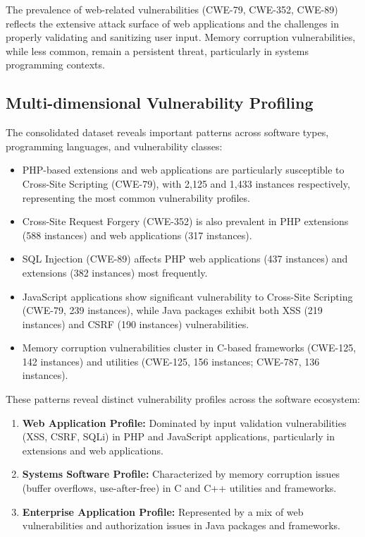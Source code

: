 The prevalence of web-related vulnerabilities (CWE-79, CWE-352, CWE-89) reflects the extensive attack surface of web applications and the challenges in properly validating and sanitizing user input. Memory corruption vulnerabilities, while less common, remain a persistent threat, particularly in systems programming contexts.

\subsection{Multi-dimensional Vulnerability Profiling}

The consolidated dataset reveals important patterns across software types, programming languages, and vulnerability classes:

\begin{itemize}
    \item PHP-based extensions and web applications are particularly susceptible to Cross-Site Scripting (CWE-79), with 2,125 and 1,433 instances respectively, representing the most common vulnerability profiles.
    \item Cross-Site Request Forgery (CWE-352) is also prevalent in PHP extensions (588 instances) and web applications (317 instances).
    \item SQL Injection (CWE-89) affects PHP web applications (437 instances) and extensions (382 instances) most frequently.
    \item JavaScript applications show significant vulnerability to Cross-Site Scripting (CWE-79, 239 instances), while Java packages exhibit both XSS (219 instances) and CSRF (190 instances) vulnerabilities.
    \item Memory corruption vulnerabilities cluster in C-based frameworks (CWE-125, 142 instances) and utilities (CWE-125, 156 instances; CWE-787, 136 instances).
\end{itemize}

These patterns reveal distinct vulnerability profiles across the software ecosystem:

\begin{enumerate}
    \item \textbf{Web Application Profile:} Dominated by input validation vulnerabilities (XSS, CSRF, SQLi) in PHP and JavaScript applications, particularly in extensions and web applications.
    \item \textbf{Systems Software Profile:} Characterized by memory corruption issues (buffer overflows, use-after-free) in C and C++ utilities and frameworks.
    \item \textbf{Enterprise Application Profile:} Represented by a mix of web vulnerabilities and authorization issues in Java packages and frameworks.
\end{enumerate}

